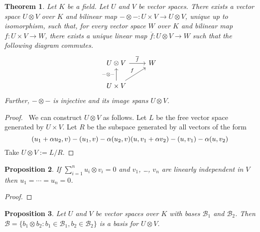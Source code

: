 \documentclass{book}
\let\qed\relax
\newtheorem{prop}{Proposition}[chapter]
\newtheorem{thm}[prop]{Theorem}
\theoremstyle{definition}
\begin{document}
\begin{thm}
Let $K$ be a field. Let $U$ and $V$ be vector spaces. There exists a vector space $U \otimes V$ over $K$ and bilinear map $- \otimes - : U \times V \rightarrow U \otimes V$, unique up to isomorphism, such that, for every vector space $W$ over $K$ and bilinear map $f : U \times V \rightarrow W$, there exists a unique linear map $\overline{f} : U \otimes V \rightarrow W$ such that the following diagram commutes.
\[ \begin{tikzcd}
U \otimes V \arrow[r,"\overline{f}"] & W \\
U \times V \arrow[u,"- \otimes -"] \arrow[ur,"f"]
\end{tikzcd} \]
Further, $- \otimes -$ is injective and its image spans $U \otimes V$.
\end{thm}

\begin{proof}
\pf\ We can construct $U \otimes V$ as follows. Let $L$ be the free vector space generated by $U \times V$. Let $R$ be the subspace generated by all vectors of the form
\begin{equation*}
(u_1 + \alpha u_2, v) - (u_1,v) - \alpha (u_2,v) \\
(u, v_1 + \alpha v_2) - (u,v_1) - \alpha (u,v_2)
\end{equation*}
Take $U \otimes V := L / R$. \qed
\end{proof}

\begin{prop}
\label{prop:linearly-disjoint}
If $\sum_{i=1}^n u_i \otimes v_i = 0$ and $v_1$, \ldots, $v_n$ are linearly independent in $V$ then $u_1 = \cdots = u_n = 0$.
\end{prop}

\begin{proof}
\pf
{}
\qed
\end{proof}

\begin{prop}
Let $U$ and $V$ be vector spaces over $K$ with bases $\mathcal{B}_1$ and $\mathcal{B}_2$. Then $\mathcal{B} = \{ b_1 \otimes b_2 : b_1 \in \mathcal{B}_1, b_2 \in \mathcal{B}_2 \}$ is a basis for $U \otimes V$.
\end{prop}
\end{document}
